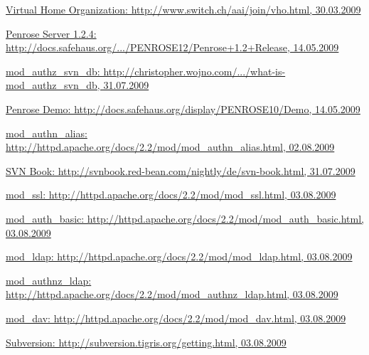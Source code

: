 \begin{thebibliography}{1}
    	
\href{http://www.switch.ch/aai/join/vho.html}{Virtual Home Organization: http://www.switch.ch/aai/join/vho.html, 30.03.2009}
    	
\href{http://docs.safehaus.org/display/PENROSE12/Penrose+1.2+Release}{Penrose Server 1.2.4: http://docs.safehaus.org/.../PENROSE12/Penrose+1.2+Release, 14.05.2009}

\href{http://christopher.wojno.com/articles/2007/08/19/what-is-mod_authz_svn_db}{mod\_authz\_svn\_db: http://christopher.wojno.com/.../what-is-mod\_authz\_svn\_db, 31.07.2009}

\href{http://docs.safehaus.org/display/PENROSE10/Demo}{Penrose Demo: http://docs.safehaus.org/display/PENROSE10/Demo, 14.05.2009}
	
\href{http://httpd.apache.org/docs/2.2/mod/mod_authn_alias.html}{mod\_authn\_alias: http://httpd.apache.org/docs/2.2/mod/mod\_authn\_alias.html, 02.08.2009}

\href{http://svnbook.red-bean.com/nightly/de/svn-book.html}{SVN Book:  http://svnbook.red-bean.com/nightly/de/svn-book.html, 31.07.2009}

\href{http://httpd.apache.org/docs/2.2/mod/mod_ssl.html}{mod\_ssl: http://httpd.apache.org/docs/2.2/mod/mod\_ssl.html, 03.08.2009}
	
\href{http://httpd.apache.org/docs/2.2/mod/mod_auth_basic.html}{mod\_auth\_basic: http://httpd.apache.org/docs/2.2/mod/mod\_auth\_basic.html, 03.08.2009}
	
\href{http://httpd.apache.org/docs/2.2/mod/mod_ldap.html}{mod\_ldap: http://httpd.apache.org/docs/2.2/mod/mod\_ldap.html, 03.08.2009}
	
\href{http://httpd.apache.org/docs/2.2/mod/mod_authnz_ldap.html}{mod\_authnz\_ldap: http://httpd.apache.org/docs/2.2/mod/mod\_authnz\_ldap.html, 03.08.2009}
	
\href{http://httpd.apache.org/docs/2.2/mod/mod_dav.html}{mod\_dav: http://httpd.apache.org/docs/2.2/mod/mod\_dav.html, 03.08.2009}
    	
\href{http://subversion.tigris.org/getting.html}{Subversion: http://subversion.tigris.org/getting.html, 03.08.2009}

	
\end{thebibliography}